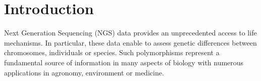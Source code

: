 \documentclass{bmcart}
\begin{document}
\begin{frontmatter}
\begin{abstractbox}
\begin{abstract}
\end{abstract}


\begin{keyword}
\end{keyword}


\end{abstractbox}
%

\end{frontmatter}




\section*{Introduction}

Next Generation Sequencing (NGS) data provides an unprecedented access to life mechanisms. In particular, these data enable to assess genetic differences between chromosomes, individuals or species. 
Such polymorphisms represent a fundamental source of information in many aspects of biology with numerous applications in agronomy, environment or medicine. 
\end{document}
